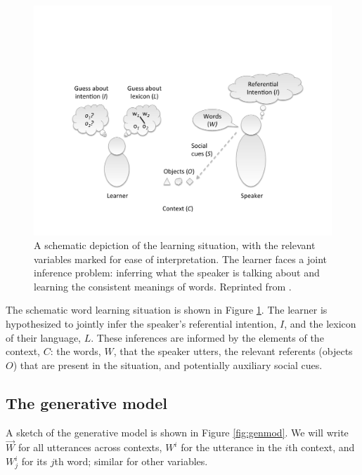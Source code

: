 \documentclass[man,noapacite,12pt]{apa2}
\begin{document}
\begin{figure}[tr]
\begin{center}
\includegraphics[width=4.5in]{figures/framework_mod.pdf}
\caption{\label{fig:setup} A schematic depiction of the learning situation, with the relevant variables marked for ease of interpretation. The learner faces a joint inference problem: inferring what the speaker is talking about and learning the consistent meanings of words. Reprinted from \protect{}.}
\end{center}
\end{figure}

The schematic word learning situation is shown in Figure \ref{fig:setup}. The learner is hypothesized to jointly infer the speaker's referential intention, $I$, and the lexicon of their language, $L$. These inferences are informed by the elements of the context, $C$: the words, $W$, that the speaker utters, the relevant referents (objects $O$) that are present in the situation, and potentially auxiliary social cues.

\subsection{The generative model}

A sketch of the generative model is shown in Figure \ref{fig:genmod}. We will write $\vec{W}$ for all utterances across contexts, $W^{i}$ for the utterance in the $i$th context, and $W^{i}_{j}$ for its $j$th word; similar for other variables.
\end{document}
